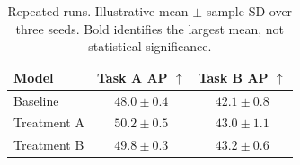 \begin{table}[!htbp]
\centering\small
\begin{tabular}{lcc}
\toprule
Model & Task A AP $\uparrow$ & Task B AP $\uparrow$ \\
\midrule
Baseline & $48.0\pm0.4$ & $42.1\pm0.8$ \\
Treatment A & $\mathbf{50.2}\pm0.5$ & $43.0\pm1.1$ \\
Treatment B & $49.8\pm0.3$ & $\mathbf{43.2}\pm0.6$ \\
\bottomrule
\end{tabular}
\caption{Repeated runs. Illustrative mean $\pm$ sample SD over three seeds. Bold identifies the largest mean, not statistical significance.}
\label{tab:repeated-runs}
\end{table}
